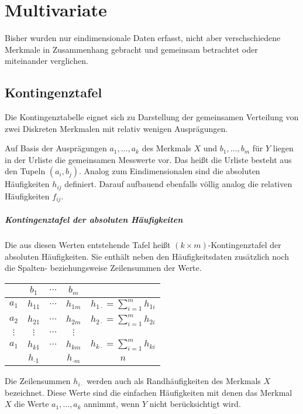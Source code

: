 \chapter{Multivariate}
Bisher wurden nur eindimensionale Daten erfasst, nicht aber verschschiedene Merkmale in Zusammenhang gebracht und gemeinsam betrachtet oder miteinander verglichen.
\section{Kontingenztafel}\label{kontingenztafel}
Die Kontingenztabelle eignet sich zu Darstellung der gemeinsamen Verteilung von zwei Diskreten Merkmalen mit relativ wenigen Ausprägungen.

Auf Basis der Ausprägungen $a_1,\ldots,a_k$ des Merkmals $X$ und $b_1,\ldots,b_m$ für $Y$ liegen in der Urliste die gemeinsamen Messwerte vor. Das heißt die Urliste besteht aus den Tupeln $(a_i,b_j)$. Analog zum Eindimensionalen sind die absoluten Häufigkeiten $h_{ij}$ definiert. Darauf aufbauend ebenfalls völlig analog die relativen Häufigkeiten $f_{ij}$.

\paragraph{Kontingenztafel der absoluten Häufigkeiten}
Die aus diesen Werten entstehende Tafel heißt $(k\times m)$-Kontingenztafel der absoluten Häufigkeiten. Sie enthält neben den Häufigkeitsdaten zusätzlich noch die Spalten- beziehungsweise Zeilensummen der Werte.

\begin{center}
	\begin{tabular}{c|ccc|c}
		& $b_1$ & $\cdots$ & $b_m$ &\\
		\hline $a_1$ & $h_{11}$ & $\cdots$ & $h_{1m}$&$h_{1\cdot}=\sum_{i=1}^m h_{1i}$\\
		$a_2$ & $h_{21}$ & $\cdots$ & $h_{2m}$&$h_{2\cdot}=\sum_{i=1}^m h_{2i}$\\
		$\vdots$ & $\vdots$ & $\cdots$ & $\vdots$&\\
		$a_1$ & $h_{k1}$ & $\cdots$ & $h_{km}$&$h_{k\cdot}=\sum_{i=1}^m h_{ki}$\\
		\hline &$h_{\cdot1}$&&$h_{\cdot m}$&$n$
	\end{tabular}
\end{center}

Die Zeilensummen $h_{i\cdot}$ werden auch als Randhäufigkeiten des Merkmals $X$ bezeichnet. Diese Werte sind die einfachen Häufigkeiten mit denen das Merkmal $X$ die Werte $a_1,\ldots,a_k$ annimmt, wenn $Y$ nicht berücksichtigt wird.

